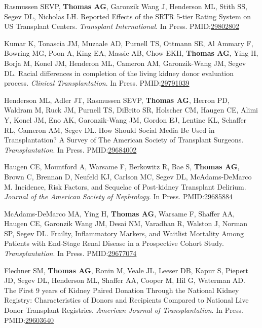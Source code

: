 \documentclass[10pt]{article}
\makeatletter
\newlength{\bibhang}
\newlength{\bibsep}
 {\@listi \global\bibsep\itemsep \global\advance\bibsep by\parsep}
\newenvironment{bibenum*}
  {\renewcommand\labelenumi{[\theenumi]}%
   \etaremune[
     topsep=0pt,
     itemsep=\bibsep,
     parsep=0pt,partopsep=0pt,
     itemindent=-\bibhang,
     leftmargin={\bibhang+\widthof{[999]}}]}
  {\endetaremune}
\newcommand{\pmid}[1]{PMID:\href{https://www.ncbi.nlm.nih.gov/pubmed/#1}{#1}}
\makeatother
\begin{document}
\begin{bibenum*}
\item Rasmussen SEVP, \textbf{Thomas AG}, Garonzik Wang J,
  Henderson ML, Stith SS, Segev DL, Nicholas LH. Reported Effects
  of the SRTR 5-tier Rating System on US Transplant Centers.
  \emph{Transplant International}. In Press.
  \pmid{29802802} 

\item Kumar K, Tonascia JM, Muzaale AD, Purnell TS, Ottmann SE,
  Al Ammary F, Bowring MG, Poon A, King EA, Massie AB, Chow EKH,
  \textbf{Thomas AG}, Ying H, Borja M, Konel JM, Henderon ML,
  Cameron AM, Garonzik-Wang JM, Segev DL. Racial differences in
  completion of the living kidney donor evaluation process.
  \emph{Clinical Transplantation}. In Press.
  \pmid{29791039} 

\item Henderson ML, Adler JT, Rasmussen SEVP, \textbf{Thomas AG},
  Herron PD, Waldram M, Ruck JM, Purnell TS, DiBrito SR, Holscher CM,
  Haugen CE, Alimi Y, Konel JM, Eno AK, Garonzik-Wang JM, Gordon EJ,
  Lentine KL, Schaffer RL, Cameron AM, Segev DL.
  How Should Social Media Be Used in Transplantation?
  A Survey of The American Society of Transplant Surgeons.
  \emph{Transplantation}. In Press.
  \pmid{29684002} 

\item Haugen CE, Mountford A, Warsame F, Berkowitz R, Bae S,
  \textbf{Thomas AG}, Brown C, Brennan D, Neufeld KJ, Carlson MC,
  Segev DL, McAdams-DeMarco M.
  Incidence, Risk Factors, and Sequelae of Post-kidney Transplant Delirium.
  \emph{Journal of the American Society of Nephrology}. In Press.
  \pmid{29685884} 

\item McAdams-DeMarco MA, Ying H, \textbf{Thomas AG}, Warsame F,
  Shaffer AA, Haugen CE, Garonzik Wang JM, Desai NM, Varadhan R,
  Walston J, Norman SP, Segev DL. Frailty, Inflammatory Markers, and
  Waitlist Mortality Among Patients with End-Stage Renal Disease in a
  Prospective Cohort Study.
  \emph{Transplantation}. In Press.
  \pmid{29677074} 

\item Flechner SM, \textbf{Thomas AG}, Ronin M,
  Veale JL, Leeser DB, Kapur S, Piepert JD, Segev DL, Henderson ML,
  Shaffer AA, Cooper M, Hil G, Waterman AD.
  The First 9 years of Kidney Paired Donation Through the National Kidney
  Registry: Characteristics of Donors and Recipients Compared to National Live
  Donor Transplant Registries.
  \emph{American Journal of Transplantation}. In Press.
  \pmid{29603640} 


\end{bibenum*}
\end{document}
